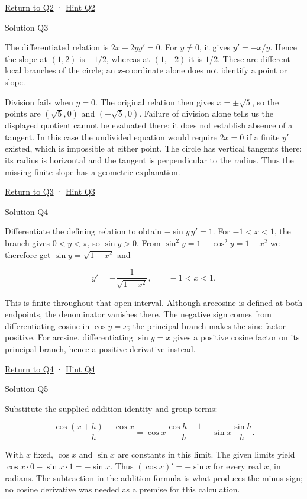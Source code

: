 \documentclass[
  11pt,
]{article}
\providecommand{\gt}{>}
\providecommand{\lt}{<}
\begin{document}
\protect\hyperlink{task-q2}{Return to Q2} ·
\protect\hyperlink{hint-q2}{Hint Q2}

Solution Q3

The differentiated relation is \(2x+2yy'=0\). For \(y\ne0\), it gives
\(y'=-x/y\). Hence the slope at \((1,2)\) is \(-1/2\), whereas at
\((1,-2)\) it is \(1/2\). These are different local branches of the
circle; an \(x\)-coordinate alone does not identify a point or slope.

Division fails when \(y=0\). The original relation then gives
\(x=\pm\sqrt5\), so the points are \((\sqrt5,0)\) and \((-\sqrt5,0)\).
Failure of division alone tells us the displayed quotient cannot be
evaluated there; it does not establish absence of a tangent. In this
case the undivided equation would require \(2x=0\) if a finite \(y'\)
existed, which is impossible at either point. The circle has vertical
tangents there: its radius is horizontal and the tangent is
perpendicular to the radius. Thus the missing finite slope has a
geometric explanation.

\protect\hyperlink{task-q3}{Return to Q3} ·
\protect\hyperlink{hint-q3}{Hint Q3}

Solution Q4

Differentiate the defining relation to obtain \(-\sin y\,y'=1\). For
\(-1\lt x\lt 1\), the branch gives \(0\lt y\lt \pi\), so
\(\sin y\gt 0\). From \(\sin^2y=1-\cos^2y=1-x^2\) we therefore get
\(\sin y=\sqrt{1-x^2}\) and

\[y'=-\frac1{\sqrt{1-x^2}},\qquad -1<x<1.\]

This is finite throughout that open interval. Although arccosine is
defined at both endpoints, the denominator vanishes there. The negative
sign comes from differentiating cosine in \(\cos y=x\); the principal
branch makes the sine factor positive. For arcsine, differentiating
\(\sin y=x\) gives a positive cosine factor on its principal branch,
hence a positive derivative instead.

\protect\hyperlink{task-q4}{Return to Q4} ·
\protect\hyperlink{hint-q4}{Hint Q4}

Solution Q5

Substitute the supplied addition identity and group terms:

\[\frac{\cos(x+h)-\cos x}{h}
=\cos x\frac{\cos h-1}{h}-\sin x\frac{\sin h}{h}.\]

With \(x\) fixed, \(\cos x\) and \(\sin x\) are constants in this limit.
The given limits yield \(\cos x\cdot0-\sin x\cdot1=-\sin x\). Thus
\((\cos x)'=-\sin x\) for every real \(x\), in radians. The subtraction
in the addition formula is what produces the minus sign; no cosine
derivative was needed as a premise for this calculation.
\end{document}
